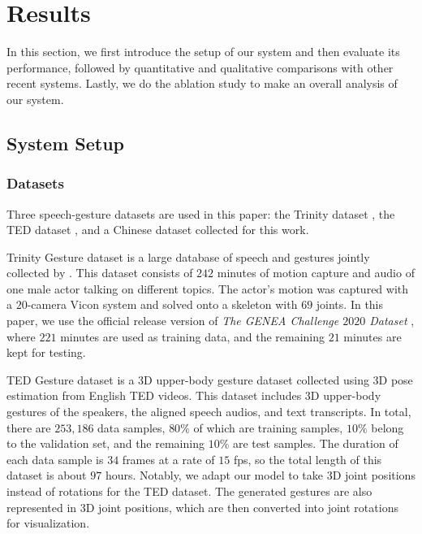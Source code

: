 \section{Results}
\label{sec:results}
In this section, we first introduce the setup of our system and then evaluate its performance, followed by quantitative and qualitative comparisons with other recent systems. Lastly, we do the ablation study to make an overall analysis of our system.

\subsection{System Setup}
\label{subsec:system_setup}
\subsubsection{Datasets}
\label{subsubsection:datasets}
Three speech-gesture datasets are used in this paper: the Trinity dataset \cite{ferstl2018investigating}, the TED dataset \cite{yoon2019robots}, and a Chinese dataset collected for this work.

Trinity Gesture dataset is a large database of speech and gestures jointly collected by \citet{ferstl2018investigating}. This dataset consists of $242$ minutes of motion capture and audio of one male actor talking on different topics. The actor’s motion was captured with a $20$-camera Vicon system and solved onto a skeleton with $69$ joints. In this paper, we use the official release version of \emph{The GENEA Challenge $2020$ Dataset} \cite{kucherenko2021large}, where $221$ minutes are used as training data, and the remaining $21$ minutes are kept for testing.

TED Gesture dataset \cite{yoon2019robots} is a 3D upper-body gesture dataset collected using 3D pose estimation from English TED videos. This dataset includes 3D upper-body gestures of the speakers, the aligned speech audios, and text transcripts. In total, there are $253,186$ data samples, $80\%$ of which are training samples, $10\%$ belong to the validation set, and the remaining $10\%$ are test samples. The duration of each data sample is $34$ frames at a rate of $15$ fps, so the total length of this dataset is about $97$ hours. Notably, we adapt our model to take 3D joint positions instead of rotations for the TED dataset. The generated gestures are also represented in 3D joint positions, which are then converted into joint rotations for visualization.

